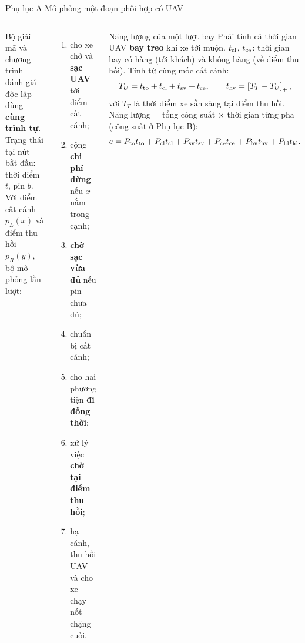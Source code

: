 \documentclass[aspectratio=169,10pt,t,xcolor={table}]{beamer}
\newcommand{\pos}[1]{\left[#1\right]_{+}}
\newcommand{\apptitle}[2]{Phụ lục #1 \textperiodcentered{} #2}
\begin{document}
\begin{frame}[label=appA]{\apptitle{A}{Mô phỏng một đoạn phối hợp có UAV}}
\begin{columns}[T,onlytextwidth]
\footnotesize
Bộ giải mã và chương trình đánh giá độc lập dùng \textbf{cùng trình tự}. Trạng thái tại nút bắt đầu: thời điểm $t$, pin $b$. Với điểm cất cánh $p_L(x)$ và điểm thu hồi $p_R(y)$, bộ mô phỏng lần lượt:
\begin{enumerate}\scriptsize
\item cho xe chở và \textbf{sạc UAV} tới điểm cất cánh;
\item cộng \textbf{chi phí dừng} nếu $x$ nằm trong cạnh;
\item \textbf{chờ sạc vừa đủ} nếu pin chưa đủ;
\item chuẩn bị cất cánh;
\item cho hai phương tiện \textbf{đi đồng thời};
\item xử lý việc \textbf{chờ tại điểm thu hồi};
\item hạ cánh, thu hồi UAV và cho xe chạy nốt chặng cuối.
\end{enumerate}
\begin{block}{Năng lượng của một lượt bay}
\scriptsize
Phải tính cả thời gian UAV \textbf{bay treo} khi xe tới muộn. $t_{\rm cl}$, $t_{\rm ce}$: thời gian bay có hàng (tới khách) và không hàng (về điểm thu hồi). Tính từ cùng mốc cất cánh:
\[
T_U=t_{\rm to}+t_{\rm cl}+t_{\rm sv}+t_{\rm ce},\qquad t_{\rm hv}=\pos{T_T-T_U},
\]
với $T_T$ là thời điểm xe sẵn sàng tại điểm thu hồi. Năng lượng = tổng công suất $\times$ thời gian từng pha (công suất ở Phụ lục B):
\[
e=P_{\rm to}t_{\rm to}+P_{\rm cl}t_{\rm cl}+P_{\rm sv}t_{\rm sv}+P_{\rm ce}t_{\rm ce}+P_{\rm hv}t_{\rm hv}+P_{\rm ld}t_{\rm ld}.
\]
\end{block}
\end{columns}
\end{frame}
\end{document}
